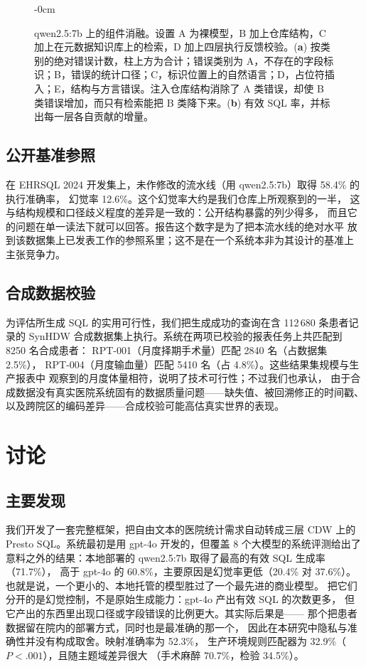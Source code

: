 \documentclass[11pt,a4paper]{article}
\newlength{\extralength}\setlength{\extralength}{2.0cm}
\begin{document}
\begin{figure}[H]
\begin{adjustwidth}{-\extralength}{0cm}
\caption{qwen2.5:7b 上的组件消融。设置 A 为裸模型，B 加上仓库结构，C 加上在元数据知识库上的检索，D 加上四层执行反馈校验。(\textbf{a}) 按类别的绝对错误计数，柱上方为合计；错误类别为 A，不存在的字段标识；B，错误的统计口径；C，标识位置上的自然语言；D，占位符插入；E，结构与方言错误。注入仓库结构消除了 A 类错误，却使 B 类错误增加，而只有检索能把 B 类降下来。(\textbf{b}) 有效 SQL 率，并标出每一层各自贡献的增量。}
\label{fig:ablation}
\end{adjustwidth}
\end{figure}

\subsection{公开基准参照}\label{sec:cn-bench}
在 EHRSQL 2024 开发集上，未作修改的流水线（用 qwen2.5:7b）取得 58.4\% 的执行准确率，
幻觉率 12.6\%。这个幻觉率大约是我们仓库上所观察到的一半，
这与结构规模和口径歧义程度的差异是一致的：公开结构暴露的列少得多，
而且它的问题在单一读法下就可以回答。报告这个数字是为了把本流水线的绝对水平
放到该数据集上已发表工作的参照系里；这不是在一个系统本非为其设计的基准上
主张竞争力。

\subsection{合成数据校验}
为评估所生成 SQL 的实用可行性，我们把生成成功的查询在含 112\,680 条患者记录的
SynHDW 合成数据集上执行。系统在两项已校验的报表任务上共匹配到 8250 名合成患者：
RPT-001（月度择期手术量）匹配 2840 名（占数据集 2.5\%），
RPT-004（月度输血量）匹配 5410 名（占 4.8\%）。这些结果集规模与生产报表中
观察到的月度体量相符，说明了技术可行性；不过我们也承认，
由于合成数据没有真实医院系统固有的数据质量问题——缺失值、被回溯修正的时间戳、
以及跨院区的编码差异——合成校验可能高估真实世界的表现。

\section{讨论}
\subsection{主要发现}
我们开发了一套完整框架，把自由文本的医院统计需求自动转成三层 CDW 上的
Presto SQL。系统最初是用 gpt-4o 开发的，但覆盖 8 个大模型的系统评测给出了
意料之外的结果：本地部署的 qwen2.5:7b 取得了最高的有效 SQL 生成率（71.7\%），
高于 gpt-4o 的 60.8\%，主要原因是幻觉率更低（20.4\% 对 37.6\%）。
也就是说，一个更小的、本地托管的模型胜过了一个最先进的商业模型。
把它们分开的是幻觉控制，不是原始生成能力：gpt-4o 产出有效 SQL 的次数更多，
但它产出的东西里出现口径或字段错误的比例更大。其实际后果是——
那个把患者数据留在院内的部署方式，同时也是最准确的那一个，
因此在本研究中隐私与准确性并没有构成取舍。映射准确率为 52.3\%，
生产环境规则匹配器为 32.9\%（$P<.001$），且随主题域差异很大
（手术麻醉 70.7\%，检验 34.5\%）。
\end{document}
